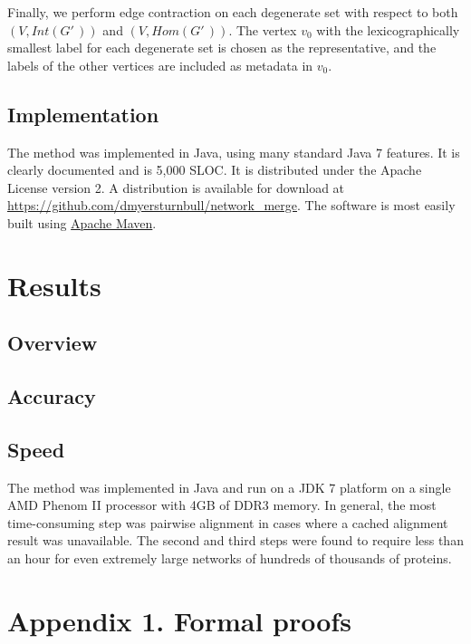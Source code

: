 \documentclass[12pt,twoside]{article}
\def\NI{\noindent}
\begin{document}
\NI Finally, we perform edge contraction on each degenerate set with respect to both $(V,Int(G'\,\!))$ and $(V,Hom(G'\,\!))$. The vertex $v_0$ with the lexicographically smallest label for each degenerate set is chosen as the representative, and the labels of the other vertices are included as metadata in $v_0$.

\subsection{Implementation}

\NI The method was implemented in Java, using many standard Java 7 features. It is clearly documented and is 5,000 SLOC. It is distributed under the Apache License version 2. A distribution is available for download at \url{https://github.com/dmyersturnbull/network_merge}. The software is most easily built using \href{http://maven.apache.org/}{Apache Maven}.

\section{Results}

\NI 

\subsection{Overview}

\subsection{Accuracy}

\subsection{Speed}

\NI The method was implemented in Java and run on a JDK 7 platform on a single AMD Phenom II processor with 4GB of DDR3 memory. In general, the most time-consuming step was pairwise alignment in cases where a cached alignment result was unavailable. The second and third steps were found to require less than an hour for even extremely large networks of hundreds of thousands of proteins.

\section{Appendix 1. Formal proofs}



\end{document}
